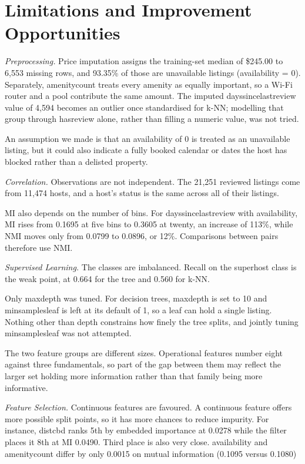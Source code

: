 \documentclass[final,1p,11pt]{elsarticle}
\renewcommand\_{\textunderscore\allowbreak}%
\begin{document}
\section{Limitations and Improvement Opportunities}

\textit{Preprocessing.} Price imputation assigns the training-set median of \$245.00 to 6,553 missing rows, and 93.35\% of those are unavailable listings (availability\_365 = 0). Separately, amenity\_count treats every amenity as equally important, so a Wi-Fi router and a pool contribute the same amount. The imputed days\_since\_last\_review value of 4,594 becomes an outlier once standardised for k-NN; modelling that group through has\_review alone, rather than filling a numeric value, was not tried.

An assumption we made is that an availability\_365 of 0 is treated as an unavailable listing, but it could also indicate a fully booked calendar or dates the host has blocked rather than a delisted property.

\textit{Correlation.} Observations are not independent. The 21,251 reviewed listings come from 11,474 hosts, and a host's status is the same across all of their listings.

MI also depends on the number of bins. For days\_since\_last\_review with availability\_365, MI rises from 0.1695 at five bins to 0.3605 at twenty, an increase of 113\%, while NMI moves only from 0.0799 to 0.0896, or 12\%. Comparisons between pairs therefore use NMI.

\textit{Supervised Learning.} The classes are imbalanced. Recall on the superhost class is the weak point, at 0.664 for the tree and 0.560 for k-NN.

Only max\_depth was tuned. For decision trees, max\_depth is set to 10 and min\_samples\_leaf is left at its default of 1, so a leaf can hold a single listing. Nothing other than depth constrains how finely the tree splits, and jointly tuning min\_samples\_leaf was not attempted.

The two feature groups are different sizes. Operational features number eight against three fundamentals, so part of the gap between them may reflect the larger set holding more information rather than that family being more informative.

\textit{Feature Selection.} Continuous features are favoured. A continuous feature offers more possible split points, so it has more chances to reduce impurity. For instance, dist\_cbd ranks 5th by embedded importance at 0.0278 while the filter places it 8th at MI 0.0490. Third place is also very close. availability\_365 and amenity\_count differ by only 0.0015 on mutual information (0.1095 versus 0.1080)
\end{document}
